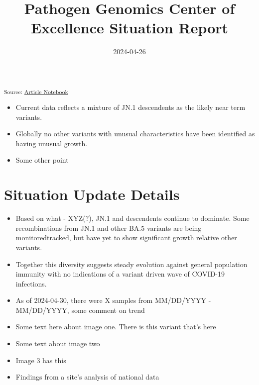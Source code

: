 \documentclass[
  twocolumn]{article}
\title{Pathogen Genomics Center of Excellence Situation Report}
\author{}
\date{2024-04-26}
\providecommand{\tightlist}{%
  \setlength{\itemsep}{0pt}\setlength{\parskip}{0pt}}\usepackage{longtable,booktabs,array}
\begin{document}
\maketitle

\textsubscript{Source:
\href{https://coe-test-org.github.io/sitrep-demo/index.qmd.html}{Article
Notebook}}

\begin{itemize}
\tightlist
\item
  Current data reflects a mixture of JN.1 descendents as the likely near
  term variants.\\
\item
  Globally no other variants with unusual characteristics have been
  identified as having unusual growth.
\item
  Some other point
\end{itemize}

\section{Situation Update Details}\label{situation-update-details}

\begin{itemize}
\tightlist
\item
  Based on what - XYZ(?), JN.1 and descendents continue to dominate.
  Some recombinations from JN.1 and other BA.5 variants are being
  monitoredtracked, but have yet to show significant growth relative
  other variants.
\item
  Together this diversity suggests steady evolution against general
  population immunity with no indications of a variant driven wave of
  COVID-19 infections.
\item
  As of 2024-04-30, there were X samples from MM/DD/YYYY - MM/DD/YYYY,
  some comment on trend
\item
  Some text here about image one. There is this variant that's here
\item
  Some text about image two
\item
  Image 3 has this
\item
  Findings from a site's analysis of national data
\end{itemize}
\end{document}
